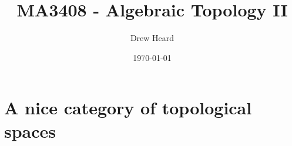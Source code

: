\documentclass[a4paper]{tufte-book}
\title{MA3408 - Algebraic Topology II}
\date{\today}
\author{Drew Heard}
\theoremstyle{remark}
\begin{document}
\maketitle


\appendix
\chapter{A nice category of topological spaces}
\end{document}
